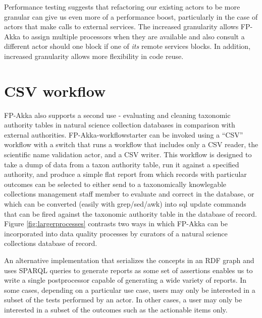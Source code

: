 \documentclass{article}
\begin{document}
Performance testing suggests that refactoring our existing actors to be more granular can give us even more of a performance boost, particularly in the case of actors that make calls to external services. The increased granularity allows FP-Akka to assign multiple processors when they are available and also consult a different actor should one block if one of \emph{its} remote services blocks. In addition, increased granularity allows more flexibility in code reuse.

\section{CSV workflow} \label{CSVWorkflow}

FP-Akka also supports a second use - evaluating and cleaning taxonomic authority tables in natural science collection databases in comparison with external authorities.  FP-Akka-workflowstarter can be invoked using a ``CSV'' workflow with a switch that runs a workflow that includes only a CSV reader, the scientific name validation actor, and a CSV writer.  This workflow is designed to take a dump of data from a taxon authority table, run it against a specified authority, and produce a simple flat report from which records with particular outcomes can be selected to either send to a taxonomically knowlegable collections management staff member to evaluate and correct in the database, or which can be converted (easily with grep/sed/awk) into sql update commands that can be fired against the taxonomic authority table in the database of record.  Figure \ref{fig:largerprocesses} contrasts two ways in which FP-Akka can be incorporated into data quality processes by curators of a natural science collections database of record.

An alternative implementation that serializes the concepts in an RDF graph and uses SPARQL queries to generate reports as some set of assertions enables us to write a single postprocessor capable of generating a wide variety of reports. In some cases, depending on a particular use case, users may only be interested in a subset of the tests performed by an actor. In other cases, a user may only be interested in a subset of the outcomes such as the actionable items only.
\end{document}
